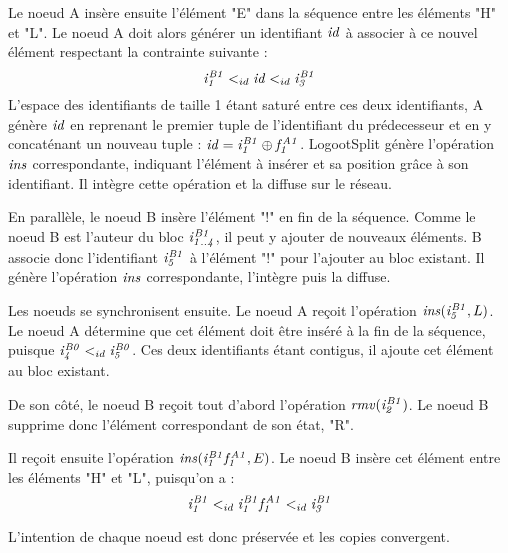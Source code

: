 Le noeud A insère ensuite l'élément "E" dans la séquence entre les éléments "H" et "L".
Le noeud A doit alors générer un identifiant $\mathit{id}$ à associer à ce nouvel élément respectant la contrainte suivante :
\begin{equation*}
  \mathit{i}^{\mathit{B1}}_{\mathit{1}} <_{id} \mathit{id} <_{id} \mathit{i}^{\mathit{B1}}_{\mathit{3}}
\end{equation*}
L'espace des identifiants de taille 1 étant saturé entre ces deux identifiants, A génère $\mathit{id}$ en reprenant le premier tuple de l'identifiant du prédecesseur et en y concaténant un nouveau tuple : $\mathit{id} = \mathit{i}^{\mathit{B1}}_{\mathit{1}} \oplus \mathit{f}^{\mathit{A1}}_{\mathit{1}}$.
LogootSplit génère l'opération $\mathit{ins}$ correspondante, indiquant l'élément à insérer et sa position grâce à son identifiant.
Il intègre cette opération et la diffuse sur le réseau.

En parallèle, le noeud B insère l'élément "!" en fin de la séquence.
Comme le noeud B est l'auteur du bloc $\mathit{i}^{\mathit{B1}}_{\mathit{1..4}}$, il peut y ajouter de nouveaux éléments.
B associe donc l'identifiant $\mathit{i}^{\mathit{B1}}_{\mathit{5}}$ à l'élément "!" pour l'ajouter au bloc existant.
Il génère l'opération $\mathit{ins}$ correspondante, l'intègre puis la diffuse.

Les noeuds se synchronisent ensuite.
Le noeud A reçoit l'opération $\mathit{ins}(\mathit{i}^{\mathit{B1}}_{\mathit{5}},L)$.
Le noeud A détermine que cet élément doit être inséré à la fin de la séquence, puisque $\mathit{i}^{\mathit{B0}}_{\mathit{4}} <_{id} \mathit{i}^{\mathit{B0}}_{\mathit{5}}$.
Ces deux identifiants étant contigus, il ajoute cet élément au bloc existant.

De son côté, le noeud B reçoit tout d'abord l'opération $\mathit{rmv}(\mathit{i}^{\mathit{B1}}_{\mathit{2}})$.
Le noeud B supprime donc l'élément correspondant de son état, "R".

Il reçoit ensuite l'opération $\mathit{ins}(\mathit{i}^{\mathit{B1}}_{\mathit{1}}\mathit{f}^{\mathit{A1}}_{\mathit{1}},E)$.
Le noeud B insère cet élément entre les éléments "H" et "L", puisqu'on a :
\begin{equation*}
  \mathit{i}^{\mathit{B1}}_{\mathit{1}} <_{id} \mathit{i}^{\mathit{B1}}_{\mathit{1}}\mathit{f}^{\mathit{A1}}_{\mathit{1}} <_{id} \mathit{i}^{\mathit{B1}}_{\mathit{3}}
\end{equation*}

L'intention de chaque noeud est donc préservée et les copies convergent.

